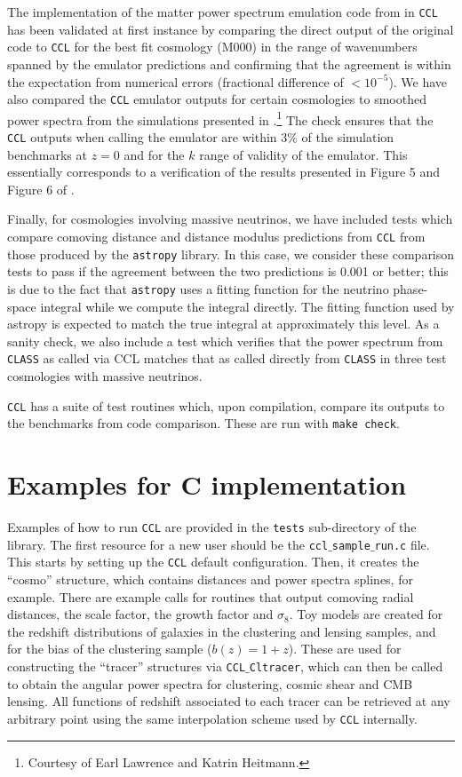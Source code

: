 \documentclass[\docopts]{\docclass}
\newcommand{\ccl}{{\tt CCL}\xspace}
\begin{document}
The implementation of the matter power spectrum emulation code from \citet{Lawrence17} in \ccl has been validated at first instance by comparing the direct output of the original code to \ccl for the best fit cosmology (M000) in the range of wavenumbers spanned by the emulator predictions and confirming that the agreement is within the expectation from numerical errors (fractional difference of $<10^{-5}$). We have also compared the \ccl emulator outputs for certain cosmologies to smoothed power spectra from the simulations presented in \citet{Lawrence17}.\footnote{Courtesy of Earl Lawrence and Katrin Heitmann.} The check ensures that the \ccl outputs when calling the emulator are within $3\%$ of the simulation benchmarks at $z=0$ and for the $k$ range of validity of the emulator. This essentially corresponds to a verification of the results presented in Figure 5 and Figure 6 of \citet{Lawrence17}.

Finally, for cosmologies involving massive neutrinos, we have included tests which compare comoving distance and distance modulus predictions from {\tt CCL} from those produced by the {\tt astropy} \citep{astropy} library. In this case, we consider these comparison tests to pass if the agreement between the two predictions is 0.001 or better; this is due to the fact that {\tt astropy} uses a fitting function for the neutrino phase-space integral while we compute the integral directly. The fitting function used by astropy is expected to match the true integral at approximately this level. As a sanity check, we also include a test which verifies that the power spectrum from {\tt CLASS} as called via CCL matches that as called directly from {\tt CLASS} in three test cosmologies with massive neutrinos. 

\ccl has a suite of test routines which, upon compilation, compare its outputs to the benchmarks from code comparison. These are run with {\tt make check}.

\section{Examples for C implementation}
\label{sec:example}

Examples of how to run \ccl are provided in the {\tt tests} sub-directory of the library. The first resource for a new user should be the {\tt ccl$\_$sample$\_$run.c} file. This starts by setting up the \ccl default configuration. Then, it creates the ``cosmo'' structure, which contains distances and power spectra splines, for example. There are example calls for routines that output comoving radial distances, the scale factor, the growth factor and $\sigma_8$. Toy models are created for the redshift distributions of galaxies in the clustering and lensing samples, and for the bias of the clustering sample ($b(z)=1+z$). These are used for constructing the ``tracer'' structures via {\tt CCL$\_$Cltracer}, which can then be called to obtain the angular power spectra for clustering, cosmic shear and CMB lensing. All functions of redshift associated to each tracer can be retrieved at any arbitrary point using the same interpolation scheme used by \ccl internally.
\end{document}

